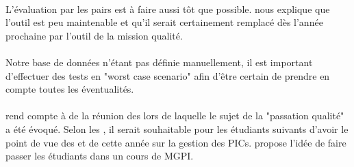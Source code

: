 \documentclass [a4paper] {article}
\begin{document}
\paragraph*{}
L'évaluation par les pairs est à faire aussi tôt que possible. \nomTuteurQualite{} nous explique que l'outil est peu maintenable et qu'il serait certainement remplacé dès l'année prochaine par l'outil de la mission qualité.

\paragraph*{}
Notre base de données n'étant pas définie manuellement, il est important d'effectuer des tests en "worst case scenario" afin d'être certain de prendre en compte toutes les éventualités.

\paragraph*{}
\Pierre{} rend compte à \nomTuteurQualite{} de la réunion des \RQ{} lors de laquelle le sujet de la "passation qualité" a été évoqué. Selon les \RQCourt{}, il serait souhaitable pour les étudiants suivants d'avoir le point de vue des \RQ{} et \CP{} de cette année sur la gestion des PICs. \nomTuteurQualite{} propose l'idée de faire passer les étudiants dans un cours de MGPI.
\end{document}
